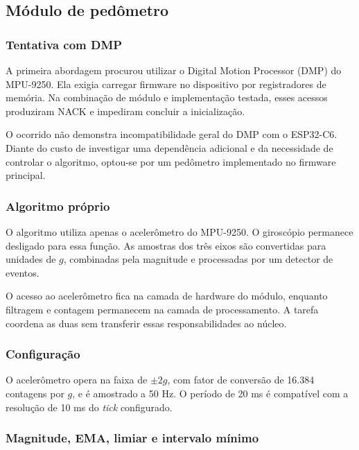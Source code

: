 \documentclass[a4paper,12pt]{article}
\begin{document}
\subsection{M\'odulo de ped\^ometro}


\subsubsection{Tentativa com DMP}


A primeira abordagem procurou utilizar o Digital Motion Processor (DMP) do MPU-9250. Ela exigia carregar firmware no dispositivo por registradores de mem\'oria. Na combina\c{c}\~ao de m\'odulo e implementa\c{c}\~ao testada, esses acessos produziram NACK e impediram concluir a inicializa\c{c}\~ao.


O ocorrido n\~ao demonstra incompatibilidade geral do DMP com o ESP32-C6. Diante do custo de investigar uma depend\^encia adicional e da necessidade de controlar o algoritmo, optou-se por um ped\^ometro implementado no firmware principal.


\subsubsection{Algoritmo pr\'oprio}


O algoritmo utiliza apenas o aceler\^ometro do MPU-9250. O girosc\'opio permanece desligado para essa fun\c{c}\~ao. As amostras dos tr\^es eixos s\~ao convertidas para unidades de $g$, combinadas pela magnitude e processadas por um detector de eventos.


O acesso ao aceler\^ometro fica na camada de hardware do m\'odulo, enquanto filtragem e contagem permanecem na camada de processamento. A tarefa coordena as duas sem transferir essas responsabilidades ao n\'ucleo.


\subsubsection{Configura\c{c}\~ao}


O aceler\^ometro opera na faixa de $\pm2g$, com fator de convers\~ao de 16.384 contagens por $g$, e \'e amostrado a 50 Hz. O per\'iodo de 20 ms \'e compat\'ivel com a resolu\c{c}\~ao de 10 ms do \emph{tick} configurado.


\subsubsection{Magnitude, EMA, limiar e intervalo m\'inimo}
\end{document}
